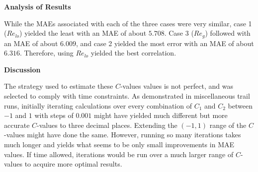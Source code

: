 \documentclass[10pt]{article}
\begin{document}
\textbf{Analysis of Results}

While the MAEs associated with each of the three cases were very similar, case 1 (\(Re_{lo}\)) yielded the least with an MAE of about \(5.708\). Case 3 (\(Re_g\)) followed with an MAE of about \(6.009\), and case 2 yielded the most error with an MAE of about \(6.316\). Therefore, using \(Re_{lo}\) yielded the best correlation. 

\textbf{Discussion}

The strategy used to estimate these \(C\)-values values is not perfect, and was selected to comply with time constraints. As demonstrated in miscellaneous trail runs, initially iterating calculations over every combination of \(C_1\) and \(C_2\) between \(-1\) and \(1\) with steps of \(0.001\) might have yielded much different but more accurate \(C\)-values to three decimal places. Extending the \((-1,1)\) range of the \(C\)-values might have done the same. However, running so many iterations takes much longer and yields what seems to be only small improvements in MAE values. If time allowed, iterations would be run over a much larger range of \(C\)-values to acquire more optimal results. 
\end{document}
